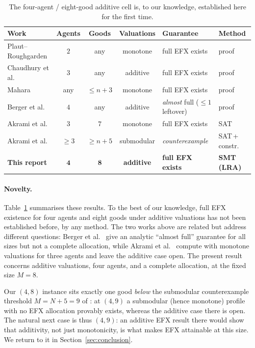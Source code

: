 \documentclass[11pt,a4paper]{article}
\theoremstyle{definition}
\theoremstyle{plain}
\newcommand{\EFX}{\textsf{EFX}}
\newcommand{\agents}{N}
\newcommand{\goods}{M}
\begin{document}
\begin{table}[h]
\centering
\small
\begin{tabular}{p{3.1cm}cccp{2.3cm}p{2.4cm}}
\toprule
Work & Agents & Goods & Valuations & Guarantee & Method\\
\midrule
Plaut--Roughgarden \cite{PlautRoughgarden2020}
  & $2$ & any & monotone & full \EFX{} exists & proof\\
Chaudhury et al. \cite{ChaudhuryGargMehlhorn2024}
  & $3$ & any & additive & full \EFX{} exists & proof\\
Mahara \cite{Mahara2024}
  & any & $\leq n{+}3$ & monotone & full \EFX{} exists & proof\\
Berger et al. \cite{BergerCohenFeldmanFiat2022}
  & $4$ & any & additive & \emph{almost} full ($\leq 1$ leftover) & proof\\
Akrami et al. \cite{AkramiEtAl2026}
  & $3$ & $7$ & monotone & full \EFX{} exists & SAT\\
Akrami et al. \cite{AkramiEtAl2026}
  & $\geq3$ & $\geq n{+}5$ & submodular & \emph{counterexample} & SAT\,+\,constr.\\
\textbf{This report}
  & $\mathbf{4}$ & $\mathbf{8}$ & \textbf{additive} & \textbf{full \EFX{} exists}
  & \textbf{SMT (LRA)}\\
\bottomrule
\end{tabular}
\caption{The four-agent / eight-good additive cell is, to our knowledge,
established here for the first time.}
\label{tab:related}
\end{table}

\paragraph{Novelty.}
Table~\ref{tab:related} summarises these results. To the best of our knowledge,
full \EFX{} existence for four agents and eight goods under additive valuations
has not been established before, by any method. The two works above are related
but address different questions: Berger et al.\ \cite{BergerCohenFeldmanFiat2022}
give an analytic ``almost full'' guarantee for all sizes but not a complete
allocation, while Akrami et al.\ \cite{AkramiEtAl2026} compute with monotone
valuations for three agents and leave the additive case open. The present result
concerns additive valuations, four agents, and a complete allocation, at the
fixed size $\goods=8$.

Our $(4,8)$ instance sits exactly one good \emph{below} the submodular
counterexample threshold $\goods=\agents+5=9$ of \cite{AkramiEtAl2026}: at
$(4,9)$ a submodular (hence monotone) profile with no \EFX{} allocation provably
exists, whereas the additive case there is open. The natural next case is thus
$(4,9)$: an additive \EFX{} result there would show that additivity, not just
monotonicity, is what makes \EFX{} attainable at this size. We return to it in
Section~\ref{sec:conclusion}.
\end{document}
